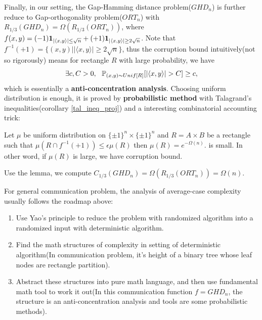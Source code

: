 \documentclass[10pt]{book}
\begin{document}
{Finally, in our setting, the Gap-Hamming distance problem($GHD_n$) is further reduce to Gap-orthogonality problem($ORT_n$) with $R_{1/3}(GHD_n)=\Omega(R_{1/3}(ORT_n))$, where $f(x,y)=(-1)\mathbf{1}_{|\langle x,y \rangle|\le\sqrt{n}}+(+1)\mathbf{1}_{|\langle x,y \rangle|\ge2\sqrt{n}}$. 
Note that $f^{-1}(+1)=\{(x,y)||\langle x,y \rangle|\ge2\sqrt{n}\}$, thus the corruption bound intuitively(not so rigorously) means for rectangle $R$ with large probability, we have
\begin{equation}
    \label{anti_concen_ghd}
    \exists c,C>0,~~\mb P_{(x,y)\sim Unif[R]}[|\langle x,y \rangle|>C]\ge c,
\end{equation}
which is essentially a \textbf{anti-concentration analysis}. Choosing uniform distribution is enough, it is proved by \textbf{probabilistic method} with Talagrand's inequalities(corollary \ref{tal_ineq_proj}) and a interesting combinatorial accounting trick:
\begin{lem}
\label{cor_bound}
Let $\mu$ be uniform distribution on $\{\pm1\}^n\times\{\pm1\}^n$ and $R=A\times B$ be a rectangle such that $\mu(R\cap f^{-1}(+1))\le \epsilon\mu(R)$ then $\mu(R)=e^{-\Omega(n)}.$ is small. In other word, if $\mu(R)$ is large, we have corruption bound.
\end{lem}
\noindent Use the lemma, we compute $C_{1/3}(GHD_n)=\Omega(R_{1/3}(ORT_n))=\Omega(n)$.
}

\begin{rmk}
For general communication problem, the analysis of average-case complexity usually follows the roadmap above:
\begin{enumerate}
    \item Use Yao's principle to reduce the problem with randomized algorithm into a randomized input with deterministic algorithm.
    \item Find the math structures of complexity in setting of deterministic algorithm(In communication problem, it's height of a binary tree whose leaf nodes are rectangle partition).
    \item Abstract these structures into pure math language, and then use fundamental math tool to work it out(In this communication function $f=GHD_n$, the structure is an anti-concentration analysis and tools are some probabilistic methods).
\end{enumerate}
\end{rmk}
\end{document}
